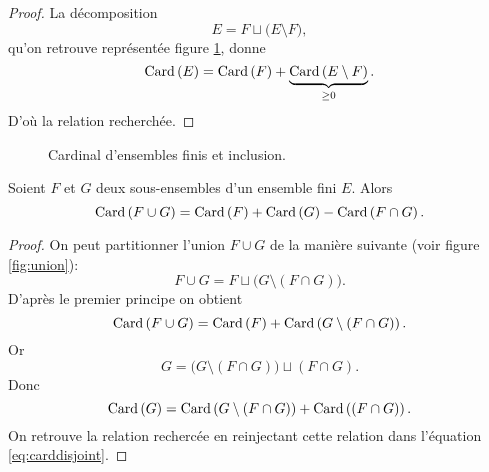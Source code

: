 \documentclass[12pt, a4paper]{article}
\begin{document}
\begin{proof}
  La décomposition
  \[
    E = F \sqcup \big( E \setminus F \big),
  \]
  qu'on retrouve représentée figure \ref{fig:subset}, donne
  \[
    \mathrm{Card}\left(E\right) = \mathrm{Card}\left(F\right) + \underbrace{\mathrm{Card}\left(E \setminus F\right)}_{\geq 0}.
  \]
  D'où la relation recherchée.
\end{proof}
\begin{figure}[h]
  \centering


  \setlength{\parskip}{5mm}

  \caption{Cardinal d'ensembles finis et inclusion.}
  \label{fig:subset}
\end{figure}
\begin{cor}
  Soient $F$ et $G$ deux sous-ensembles d'un ensemble fini $E$. Alors
  \[
    \mathrm{Card}\left(F \cup G\right) = \mathrm{Card}\left(F\right) + \mathrm{Card}\left(G\right) - \mathrm{Card}\left(F\cap G\right).
  \]
\end{cor}
\begin{proof}
  On peut partitionner l'union $F \cup G$ de la manière suivante (voir
  figure \ref{fig:union}):
  \[
    F\cup G = F\sqcup \Big( G\setminus (F\cap G) \Big).
  \]
  D'après le premier principe on obtient
  \begin{equation}
    \label{eq:carddisjoint}
    \mathrm{Card}\left(F\cup G\right) = \mathrm{Card}\left(F\right) + \mathrm{Card}\left(G\setminus (F\cap G)\right).
  \end{equation}
  Or
  \[
    G = \Big(G\setminus (F\cap G)\Big) \sqcup (F\cap G).
  \]
  Donc
  \[
    \mathrm{Card}\left(G\right) = \mathrm{Card}\left(G\setminus (F\cap G)\right) + \mathrm{Card}\left((F\cap G)\right).
  \]
  On retrouve la relation rechercée en reinjectant cette relation dans
  l'équation \ref{eq:carddisjoint}.
\end{proof}
\end{document}
